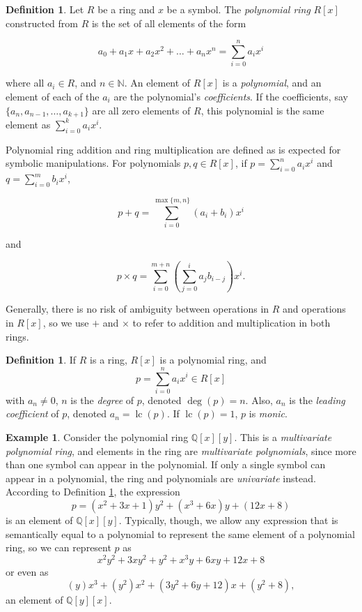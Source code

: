 \documentclass{article}
\theoremstyle{definition}
\newtheorem{defin}[thm]{Definition}
\newtheorem{exa}[thm]{Example}
\DeclareMathOperator{\lc}{lc}
\begin{document}
\begin{defin} \label{def7}
    Let $R$ be a ring and $x$ be a symbol. The \emph{polynomial ring} $R[x]$ constructed from $R$ is the set of all elements of the form
    
    \begin{equation*}
        a_0 + a_1x + a_2x^2 + \ldots + a_nx^n = \sum_{i=0}^na_ix^i
    \end{equation*}
    
    where all $a_i \in R$, and $n \in \mathbb{N}$.  An element of $R[x]$ is a \emph{polynomial}, and an element of each of the $a_i$ are the polynomial's \emph{coefficients}. If the coefficients, say $\{a_{n}, a_{n-1}, \ldots, a_{k+1}\}$ are all zero elements of $R$, this polynomial is the same element as $\sum_{i=0}^ka_ix^i$. 
    
     Polynomial ring addition and ring multiplication are defined as is expected for symbolic manipulations. For polynomials $p, q \in R[x]$, if $p = \sum_{i=0}^{n}a_ix^i$ and $q = \sum_{i=0}^{m}b_ix^i$,
    
    \begin{equation*}
        p + q = \sum_{i=0}^{\max\{m,n\}} (a_i+b_i)x^i
    \end{equation*}
    
    and
    
    \begin{equation*}
        p \times q = \sum_{i=0}^{m + n} 
        (\sum_{j=0}^{i}a_jb_{i-j}) x^i.
    \end{equation*}
    
    Generally, there is no risk of ambiguity between operations in $R$ and operations in $R[x]$, so we use $+$ and $\times$ to refer to addition and multiplication in both rings.
    
    \begin{defin}
        If $R$ is a ring, $R[x]$ is a polynomial ring, and \[p=\sum_{i=0}^na_ix^i \in R[x]\] with $a_n \neq 0$, $n$ is the \emph{degree} of $p$, denoted $\deg(p) = n$. Also, $a_n$ is the \emph{leading coefficient} of $p$, denoted $a_n = \lc(p)$. If $\lc(p) = 1$, $p$ is \emph{monic}.    \end{defin}
    
    \begin{exa}
        Consider the polynomial ring $\mathbb{Q}[x][y]$. This is a \emph{multivariate polynomial ring}, and elements in the ring are \emph{multivariate polynomials}, since more than one symbol can appear in the polynomial. If only a single symbol can appear in a polynomial, the ring and polynomials are \emph{univariate} instead. According to Definition \ref{def7}, the expression \[p = (x^2+ 3x+1)y^2 + (x^3 + 6x)y + (12x + 8)\] is an element of $\mathbb{Q}[x][y]$. Typically, though, we allow any expression that is semantically equal to a polynomial to represent the same element of a polynomial ring, so we can represent $p$ as \[x^2y^2+3xy^2 + y^2 + x^3y + 6xy + 12x + 8\]
        or even as
        \[(y)x^3 + (y^2)x^2 + (3y^2 + 6y + 12)x + (y^2 + 8),\] an element of $\mathbb{Q}[y][x]$.
        

\end{exa}
\end{defin}
\end{document}
